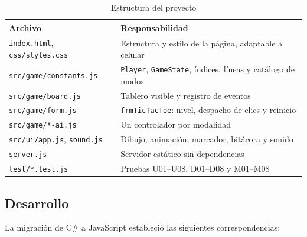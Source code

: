 \documentclass[12pt,a4paper]{article}
\begin{document}
\begin{table}[H]
\centering\small
\caption{Estructura del proyecto}
\begin{tabular}{p{4.6cm}p{9cm}}
\toprule
\textbf{Archivo} & \textbf{Responsabilidad}\\
\midrule
\texttt{index.html}, \texttt{css/styles.css} & Estructura y estilo de la página, adaptable a celular\\
\texttt{src/game/constants.js} & \texttt{Player}, \texttt{GameState}, índices, líneas y catálogo de modos\\
\texttt{src/game/board.js} & Tablero visible y registro de eventos\\
\texttt{src/game/form.js} & \texttt{frmTicTacToe}: nivel, despacho de clics y reinicio\\
\texttt{src/game/*-ai.js} & Un controlador por modalidad\\
\texttt{src/ui/app.js}, \texttt{sound.js} & Dibujo, animación, marcador, bitácora y sonido\\
\texttt{server.js} & Servidor estático sin dependencias\\
\texttt{test/*.test.js} & Pruebas U01--U08, D01--D08 y M01--M08\\
\bottomrule
\end{tabular}
\end{table}

\subsection{Desarrollo}
La migración de C\# a JavaScript estableció las siguientes correspondencias:
\end{document}
